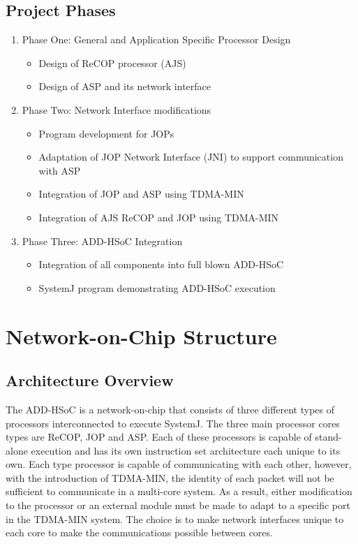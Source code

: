 \documentclass[]{article}
\begin{document}
	\subsection{Project Phases}
	\begin{enumerate}
		\item Phase One: General and Application Specific Processor Design
		\begin{itemize}
			\item Design of ReCOP processor (AJS)
			\item Design of ASP and its network interface
		\end{itemize}
		
		\item Phase Two: Network Interface modifications
		\begin{itemize}
			\item Program development for JOPs
			\item Adaptation of JOP Network Interface (JNI) to support communication with ASP
			\item Integration of JOP and ASP using TDMA-MIN
			\item Integration of AJS ReCOP and JOP using TDMA-MIN
		\end{itemize}
		
		\item Phase Three: ADD-HSoC Integration
		\begin{itemize}
			\item Integration of all components into full blown ADD-HSoC
			\item SystemJ program demonstrating ADD-HSoC execution
		\end{itemize}
		
	\end{enumerate}
	
	
	
	\section{Network-on-Chip Structure}
	
	\subsection{Architecture Overview}
	The ADD-HSoC is a network-on-chip that consists of three different types of processors interconnected to execute SystemJ. The three main processor cores types are ReCOP, JOP and ASP. Each of these processors is capable of stand-alone execution and has its own instruction set architecture each unique to its own. Each type processor is capable of communicating with each other, however, with the introduction of TDMA-MIN, the identity of each packet will not be sufficient to communicate in a multi-core system. As a result, either modification to the processor or an external module must be made to adapt to a specific port in the TDMA-MIN system. The choice is to make network interfaces unique to each core to make the communications possible between cores. \par 
	
\end{document}
